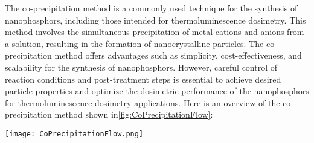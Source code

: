 \documentclass[../synthesis.tex]{subfiles}
\begin{document}
    The co-precipitation method\cite{a8} is a commonly used technique for the synthesis of nanophosphors, including 
    those intended for thermoluminescence dosimetry. This method involves the simultaneous precipitation of 
    metal cations and anions from a solution, resulting in the formation of nanocrystalline particles.
    The co-precipitation method offers advantages such as simplicity, cost-effectiveness, and scalability for 
    the synthesis of nanophosphors. However, careful control of reaction conditions and post-treatment steps 
    is essential to achieve desired particle properties and optimize the dosimetric performance of the 
    nanophosphors for thermoluminescence dosimetry applications. Here is an overview of the co-precipitation 
    method shown in\ref{fig:CoPrecipitationFlow}:
    \begin{Figure}
        \centering
        \texttt{[image: CoPrecipitationFlow.png]}
        \label{fig:CoPrecipitationFlow}
    \end{Figure}
\end{document}
